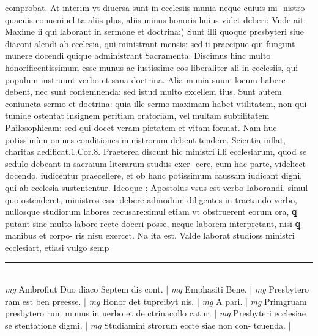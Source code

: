 \documentclass{article}
\begin{document}
\begin{pages}
comprobat. At interim vt diuersa sunt in ecclesiis munia neque cuiuis mi- nistro quaeuis conueniuel ta aliis plus, aliis minus honoris huius videt deberi: Vnde ait:  \pend\pstart Maxime ii qui laborant in sermone et doctrina:) Sunt illi quoque presbyteri siue diaconi alendi ab ecclesia, qui ministrant mensis: sed ii praecipue qui fungunt munere docendi quique administrant Sacramenta. Discimus hinc multo honorificentissimum esse munus ac iustissime eos liberaliter ali in ecclesiis, qui populum instruunt verbo et sana doctrina. Alia munia suum locum habere debent, nec sunt contemnenda: sed istud multo excellem tius. Sunt autem coniuncta sermo et doctrina: quia ille sermo maximam habet vtilitatem, non qui tumide ostentat insignem peritiam oratoriam, vel multam subtilitatem Philosophicam: sed qui docet veram pietatem et vitam format. Nam huc potissimùm omnes conditiones ministrorum debent tendere. Scientia inflat, charitas aedificat.1.Cor.8. Praeterea discunt hic ministri illi ecclesiarum, quod se sedulo debeant in sacraium literarum studiis exer- cere, cum hac parte, videlicet docendo, iudicentur praecellere, et ob hanc potissimum caussam iudicant digni, qui ab ecclesia sustententur. Ideoque ; Apostolus vsus est verbo Iaborandi, simul quo ostenderet, ministros esse debere admodum diligentes in tractando verbo, nullosque studiorum labores recusare:simul etiam vt obstruerent eorum ora, ꝗ putant sine multo labore recte doceri posse, neque laborem interpretant, nisi ꝗ manibus et corpo- ris nisu exercet. Na ita est. Valde laborat studioss ministri ecclesiart, etiasi vulgo semp  \pend
\vspace{0.5cm}\noindent
\vspace{0.2cm}\rule{1cm}{0.2pt}\\ 
\hspace{0.2cm}\textit{mg}
\footnotesize Ambrofiut Duo diaco Septem dis cont. 
\normalsize| 
\hspace{0.2cm}\textit{mg}
\footnotesize Emphasiti Bene. 
\normalsize| 
\hspace{0.2cm}\textit{mg}
\footnotesize Presbytero ram est ben preesse. 
\normalsize| 
\hspace{0.2cm}\textit{mg}
\footnotesize Honor det tupreibyt nis. 
\normalsize| 
\hspace{0.2cm}\textit{mg}
\footnotesize A pari. 
\normalsize| 
\hspace{0.2cm}\textit{mg}
\footnotesize Primgruam presbytero rum munus in uerbo et de ctrinacollo catur. 
\normalsize| 
\hspace{0.2cm}\textit{mg}
\footnotesize Presbyteri ecclesiae se stentatione digmi. 
\normalsize| 
\hspace{0.2cm}\textit{mg}
\footnotesize Studiamini strorum eccte siae non con- tcuenda. 
\normalsize| 

\end{pages}
\end{document}

